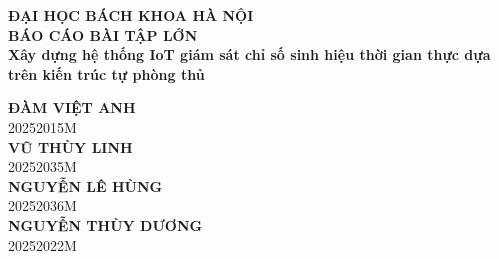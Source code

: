 \documentclass[a4paper,13pt,3p,oneside]{report}
\begin{document}
\begin{titlepage}
\thispagestyle{empty}
\begin{center}

{\textbf{\large{ĐẠI HỌC BÁCH KHOA HÀ NỘI}}}\\[0.3cm]

\vspace{3.0cm}
{\textbf{\huge{BÁO CÁO BÀI TẬP LỚN}}}\\[0.6cm]
\vspace{2.0cm}
{\textbf{\Large{Xây dựng hệ thống IoT giám sát chỉ số sinh hiệu thời gian thực dựa trên kiến trúc tự phòng thủ}}}\\[1.0cm]
\vspace{1.0cm}

{\textbf{\large{ĐÀM VIỆT ANH}}}\\
{\large{20252015M}}\\[0.15cm]
{\textbf{\large{VŨ THÙY LINH}}}\\
{\large{20252035M}}\\[0.15cm]
{\textbf{\large{NGUYỄN LÊ HÙNG}}}\\
{\large{20252036M}}\\[0.15cm]
{\textbf{\large{NGUYỄN THÙY DƯƠNG}}}\\
{\large{20252022M}}\\[0.4cm]

\vspace{0.6cm}
\begin{table}[H]
\centering
{}
\end{table}

\end{center}
\end{titlepage}
\end{document}
